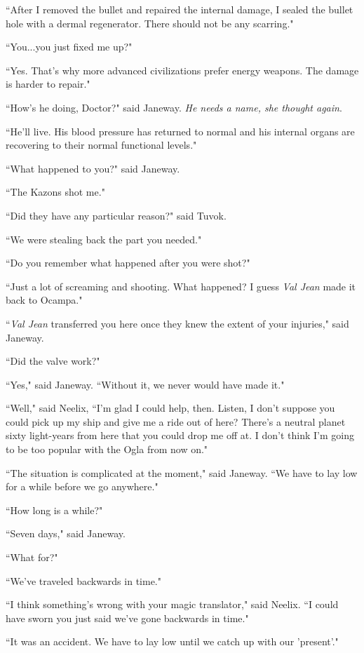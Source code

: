 \documentclass[twoside,letterpaper,12pt]{memoir}
\begin{document}
``After I removed the bullet and repaired the internal damage, I sealed the bullet hole with a dermal regenerator. There should not be any scarring." 

``You...you just fixed me up?" 

``Yes. That's why more advanced civilizations prefer energy weapons. The damage is harder to repair." 

``How's he doing, Doctor?" said Janeway. \textit{He needs a name, she thought again}. 

``He'll live. His blood pressure has returned to normal and his internal organs are recovering to their normal functional levels." 

``What happened to you?" said Janeway. 

``The Kazons shot me." 

``Did they have any particular reason?" said Tuvok. 

``We were stealing back the part you needed." 

``Do you remember what happened after you were shot?" 

``Just a lot of screaming and shooting. What happened? I guess \textit{Val Jean} made it back to Ocampa." 

``\textit{Val Jean} transferred you here once they knew the extent of your injuries," said Janeway. 

``Did the valve work?" 

``Yes," said Janeway. ``Without it, we never would have made it." 

``Well," said Neelix, ``I'm glad I could help, then. Listen, I don't suppose you could pick up my ship and give me a ride out of here? There's a neutral planet sixty light-years from here that you could drop me off at. I don't think I'm going to be too popular with the Ogla from now on." 

``The situation is complicated at the moment," said Janeway. ``We have to lay low for a while before we go anywhere." 

``How long is a while?" 

``Seven days," said Janeway. 

``What for?" 

``We've traveled backwards in time." 

``I think something's wrong with your magic translator," said Neelix. ``I could have sworn you just said we've gone backwards in time." 

``It was an accident. We have to lay low until we catch up with our 'present'." 
\end{document}
